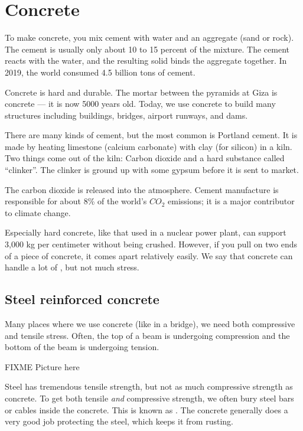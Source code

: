 \chapter{Concrete}

To make concrete, you mix cement with water and an aggregate (sand or
rock).  The cement is usually only about 10 to 15 percent of the
mixture. The cement reacts with the water, and the resulting solid
binds the aggregate together. In 2019, the world consumed 4.5 billion
tons of cement. 

Concrete is hard and durable. The mortar between the pyramids at Giza
is concrete --- it is now 5000 years old. Today, we use concrete to
build many structures including buildings, bridges, airport runways,
and dams.

There are many kinds of cement, but the most common is Portland
cement. It is made by heating limestone (calcium carbonate) with clay
(for silicon) in a kiln. Two things come out of the kiln: Carbon
dioxide and a hard substance called ``clinker''.  The clinker is
ground up with some gypsum before it is sent to market.

The carbon dioxide is released into the atmosphere. Cement manufacture
is responsible for about 8\% of the world's $CO_2$ emissions; it is a
major contributor to climate change.

Especially hard concrete, like that used in a nuclear power plant, can
support 3,000 kg per centimeter without being crushed. However, if
you pull on two ends of a piece of concrete, it comes apart relatively
easily. We say that concrete can handle a lot of , but not much  stress.

\section{Steel reinforced concrete}

Many places where we use concrete (like in a bridge), we need both
compressive and tensile stress. Often, the top of a beam is undergoing
compression and the bottom of the beam is undergoing tension.

FIXME Picture here

Steel has tremendous tensile strength, but not as much compressive
strength as concrete. To get both tensile \emph{and} compressive
strength, we often bury steel bars or cables inside the concrete.
This is known as . The concrete
generally does a very good job protecting the steel, which keeps it
from rusting.


